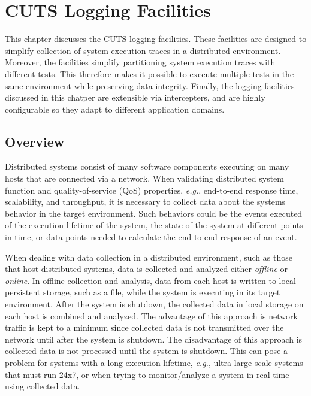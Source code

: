 

\chapter{CUTS Logging Facilities}
\label{chap:logging}

This chapter discusses the CUTS logging facilities. These facilities
are designed to simplify collection of system execution traces in 
a distributed environment. Moreover, the facilities simplify partitioning
system execution traces with different tests. This therefore makes it
possible to execute multiple tests in the same environment while 
preserving data integrity. Finally, the logging facilities discussed in
this chatper are extensible via intercepters, and are highly configurable 
so they adapt to different application domains.

\section{Overview}
\label{sec:logging-overview}

Distributed systems consist of many software components executing on
many hosts that are connected via a network. When validating distributed
system function and quality-of-service (QoS) properties, \textit{e.g.},
end-to-end response time, scalability, and throughput, it is necessary
to collect data about the systems behavior in the target environment.
Such behaviors could be the events executed of the execution lifetime of
the system, the state of the system at different points in time, or data 
points needed to calculate the end-to-end response of an event.

When dealing with data collection in a distributed environment, such 
as those that host distributed systems, data is collected and analyzed
either \textit{offline} or \textit{online}. In offline collection and 
analysis, data from each host is written to local persistent storage, 
such as a file, while the system is executing in its target environment. 
After the system is shutdown, the collected data in local storage on each 
host is combined and analyzed. The advantage of this approach is network 
traffic is kept to a minimum since collected data is not transmitted over
the network until after the system is shutdown. The disadvantage of this 
approach is collected data is not processed until the system is shutdown.
This can pose a problem for systems with a long execution lifetime, 
\textit{e.g.}, ultra-large-scale systems that must run 24x7, or when 
trying to monitor/analyze a system in real-time using collected data.

